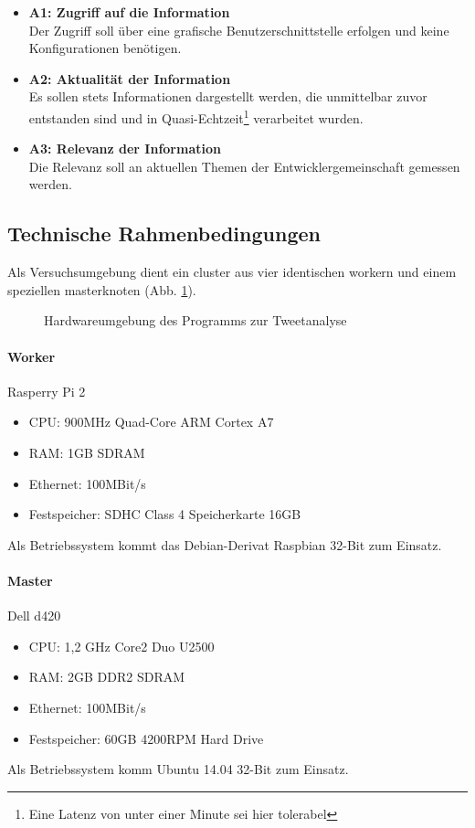 \begin{itemize}
	\item \textbf{A1: Zugriff auf die Information}\\
	Der Zugriff soll über eine grafische Benutzerschnittstelle erfolgen und keine Konfigurationen benötigen.
	\item \textbf{A2: Aktualität der Information}\\
	Es sollen stets Informationen dargestellt werden, die unmittelbar zuvor entstanden sind und in Quasi-Echtzeit\footnote{Eine Latenz von unter einer Minute sei hier tolerabel} verarbeitet wurden.
	\item \textbf{A3: Relevanz der Information}\\
	Die Relevanz soll an aktuellen Themen der Entwicklergemeinschaft gemessen werden.
\end{itemize}

\subsection{Technische Rahmenbedingungen}

Als Versuchsumgebung dient ein \gls{cluster} aus vier identischen \gls{worker}n und einem speziellen \gls{master}knoten (Abb. \ref{figure:versuchsaufbau}).

\begin{figure}[h]
	\centering
  
	\caption{Hardwareumgebung des Programms zur Tweetanalyse}
	\label{figure:versuchsaufbau}
\end{figure}

\paragraph{Worker}
Rasperry Pi 2
\begin{itemize}
	\item CPU: 900MHz Quad-Core ARM Cortex A7
	\item RAM: 1GB SDRAM
	\item Ethernet: 100MBit/s
	\item Festspeicher: SDHC Class 4 Speicherkarte 16GB
\end{itemize}
Als Betriebssystem kommt das Debian-Derivat Raspbian\cite{raspbian} 32-Bit zum Einsatz.

\paragraph{Master}
Dell d420
\begin{itemize}
	\item CPU: 1,2 GHz Core2 Duo U2500
	\item RAM: 2GB DDR2 SDRAM
	\item Ethernet: 100MBit/s
	\item Festspeicher: 60GB 4200RPM Hard Drive
\end{itemize}
Als Betriebssystem komm Ubuntu\cite{ubuntu} 14.04 32-Bit zum Einsatz.

